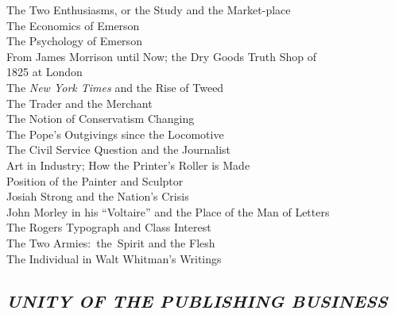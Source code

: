 \documentclass[openany,nobib]{tufte-book}
\begin{document}
The Two Enthusiasms, or the Study and the Market-place~\\
The Economics of Emerson~\\
The Psychology of Emerson~\\
From James Morrison until Now; the Dry Goods Truth Shop of\\\hspace{.25in}1825 at
London~\\
The \emph{New York Times} and the Rise of Tweed~\\
The Trader and the Merchant ~\\
The Notion of Conservatism Changing~\\
The Pope's Outgivings since the Locomotive~\\
The Civil Service Question and the Journalist~\\
Art in Industry; How the Printer's Roller is Made~\\
Position of the Painter and Sculptor~\\
Josiah Strong and the Nation's Crisis~\\
John Morley in his ``Voltaire'' and the Place of the Man of Letters~\\
The Rogers Typograph and Class Interest~\\
The Two Armies:~the~Spirit and the Flesh~\\
The Individual in Walt Whitman's Writings ~


\hypertarget{unity-of-the-publishing-business}{%
\subsection{\texorpdfstring{\emph{UNITY OF THE PUBLISHING
BUSINESS}}{UNITY OF THE PUBLISHING BUSINESS}}\label{unity-of-the-publishing-business}}
\end{document}
